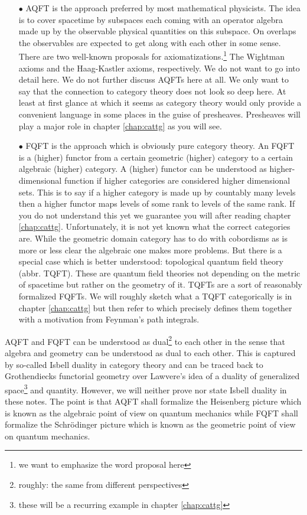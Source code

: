 \begin{enumerate}
\item[$\bullet$]
AQFT is the approach preferred by most mathematical physicists. The idea is to cover spacetime by subspaces each coming with an operator algebra made up by the observable physical quantities on this subspace. On overlaps the observables are expected to get along with each other in some sense. There are two well-known proposals for axiomatizations.\footnote{we want to emphasize the word {\glqq}proposal{\grqq} here} The Wightman axioms and the Haag-Kastler axioms, respectively. We do not want to go into detail here. We do not further discuss AQFTs here at all. We only want to say that the connection to category theory does not look so deep here. At least at first glance at which it seems as category theory would only provide a convenient language in some places in the guise of presheaves. Presheaves will play a major role in chapter \ref{chap:cattg} as you will see.
\item[$\bullet$]
FQFT is the approach which is obviously pure category theory. An FQFT is a (higher) {\glqq}functor{\grqq} from a certain geometric (higher) category to a certain algebraic (higher) category. A (higher) functor can be understood as higher-dimensional function if higher categories are considered higher dimensional sets. This is to say if a higher category is made up by countably many levels then a higher functor maps levels of some rank to levels of the same rank. If you do not understand this yet we guarantee you will after reading chapter \ref{chap:cattg}. Unfortunately, it is not yet known what the correct categories are. While the geometric domain category has to do with cobordisms as is more or less clear the algebraic one makes more problems. But there is a special case which is better understood: topological quantum field theory (abbr. TQFT). These are quantum field theories not depending on the metric of spacetime but rather on the geometry of it. TQFTs are a sort of reasonably formalized FQFTs. We will roughly sketch what a TQFT categorically is in chapter \ref{chap:cattg} but then refer to \cite{00000011} which precisely defines them together with a motivation from Feynman's path integrals.
\end{enumerate}
AQFT and FQFT can be understood as dual\footnote{roughly: the same from different perspectives} to each other in the sense that algebra and geometry can be understood as dual to each other. This is captured by so-called Isbell duality in category theory and can be traced back to Grothendiecks functorial geometry over Lawvere's idea of a duality of generalized space\footnote{these will be a recurring example in chapter \ref{chap:cattg}} and quantity. However, we will neither prove nor state Isbell duality in these notes. The point is that AQFT shall formalize the Heisenberg picture which is known as the algebraic point of view on quantum mechanics while FQFT shall formalize the Schr\"odinger picture which is known as the geometric point of view on quantum mechanics.
